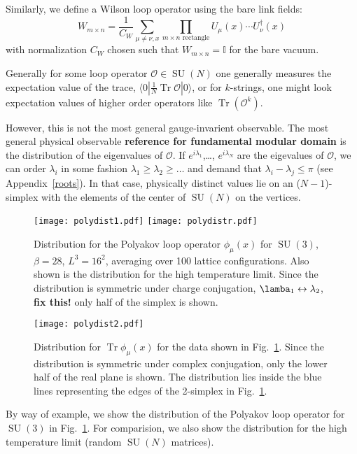 \documentclass[preprint,aps,prd]{revtex4-2}
\newcommand{\be}{\begin{equation}}
\newcommand{\eq}{\end{equation}}
\DeclareMathOperator{\SU}{SU}
\DeclareMathOperator{\Tr}{Tr}
\begin{document}
Similarly, we define a Wilson loop operator using the bare link
fields:
\be
       W_{m\times n} = \frac{1}{C_W} \sum_{\mu \ne \nu, x}
         \prod_{\mbox{$m\times n$ rectangle}}
         U_\mu(x) \cdots U_\nu^\dagger (x)
\eq
with normalization $C_W$ chosen such that $W_{m\times n} = \mathbb{I}$
for the bare vacuum.

Generally for some loop operator $\mathcal{O}\in\SU(N)$ one generally
measures the expectation value of the trace,
$\langle 0 | \frac{1}{N} \Tr \mathcal{O} |0\rangle$, or for $k$-strings,
one might look expectation values of higher order operators
like $\Tr\left( \mathcal{O}^k\right)$.

However, this is not the most general gauge-invarient observable.
The most general physical observable {\bf reference for fundamental modular domain} is the distribution of the
eigenvalues of $\mathcal{O}$.  If $e^{i\lambda_1}$,\ldots, $e^{i\lambda_N}$
are the eigevalues of $\mathcal{O}$, we can order $\lambda_i$ in
some fashion $\lambda_1\ge \lambda_2 \ge \ldots$ and demand that
$\lambda_i-\lambda_j\le \pi$ (see Appendix~\ref{roots}).
In that case, physically
distinct values lie on an ($N-1$)-simplex with the elements of the
center of $\SU(N)$ on the vertices.

\begin{figure}
  \texttt{[image: polydist1.pdf]}
  \texttt{[image: polydistr.pdf]}
  \caption{Distribution for the Polyakov loop operator
    $\phi_\mu(x)$ for $\SU(3)$, $\beta=28$, $L^3=16^2$,
    averaging over 100 lattice configurations.
    Also shown is the distribution for the high temperature
    limit.  Since the distribution is symmetric under charge
    conjugation, $\lamba_1 \leftrightarrow \lambda_2$, {\bf fix this!}
    only half of the simplex is shown.
   \label{polydist1}}
\end{figure}
\begin{figure}
  \texttt{[image: polydist2.pdf]}
  \caption{Distribution for $\Tr \phi_\mu(x)$ for
    the data shown in Fig.~\ref{polydist1}.  Since
    the distribution is symmetric under complex conjugation,
    only the lower half of the real plane is shown.
    The distribution lies inside the blue lines representing
    the edges of the 2-simplex in Fig.~\ref{polydist1}.
    \label{polydist2}}
\end{figure}

By way of example, we show the distribution of the
Polyakov loop operator for $\SU(3)$ in Fig.~\ref{polydist1}.
For comparision, we also show the distribution for
the high temperature limit (random $\SU(N)$ matrices).
\end{document}
